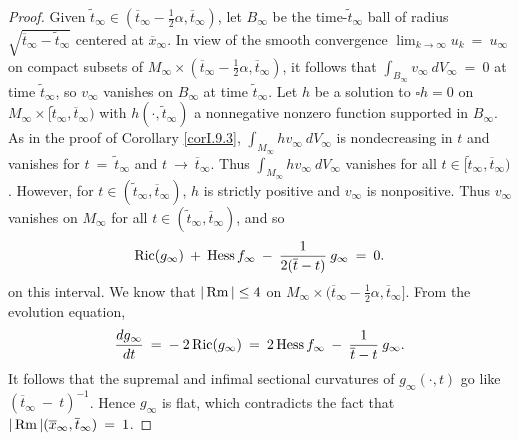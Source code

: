 \begin{proof}
Given $\widetilde{t}_\infty \in (\overline{t}_\infty -
\frac12 \alpha, \overline{t}_\infty)$,
let $B_\infty$ be the time-$\widetilde{t}_\infty$ ball of radius
$\sqrt{\overline{t}_\infty - \widetilde{t}_\infty}$
centered at $\overline{x}_\infty$.
In view of the smooth convergence
$\lim_{k \rightarrow \infty} u_k \: = \: u_\infty$ on
compact subsets of
$M_\infty \times (\overline{t}_\infty - \frac12 \alpha,
\overline{t}_\infty)$,
it follows that
$\int_{B_\infty} v_\infty \: dV_\infty \: = \: 0$ at time $\widetilde{t}_\infty$, so
$v_\infty$ vanishes on $B_\infty$ at time $\widetilde{t}_\infty$. Let $h$ be a solution
to $\square h = 0$ on $M_\infty \times [\widetilde{t}_\infty, \overline{t}_\infty)$ with
$h(\cdot, \widetilde{t}_\infty)$ a nonnegative nonzero function supported in
$B_\infty$. As in the proof of Corollary \ref{corI.9.3},
$\int_{M_\infty} h v_\infty \: dV_\infty$ is nondecreasing in $t$ and vanishes for
$t \: = \: \widetilde{t}_\infty$ and  $t \: \rightarrow \: \overline{t}_\infty$.
Thus $\int_{M_\infty} h v_\infty \: dV_\infty$ vanishes for all
$t \in [\widetilde{t}_\infty, \overline{t}_\infty)$. However, for $t \in
(\widetilde{t}_\infty, \overline{t}_\infty)$, $h$ is strictly positive and
$v_\infty$ is nonpositive.  Thus $v_\infty$ vanishes on $M_\infty$ for all
$t \in (\widetilde{t}_\infty, \overline{t}_\infty)$, and so
\begin{equation}
\operatorname{Ric}(g_\infty) \: + \: \operatorname{Hess} f_\infty \: - \:
\frac{1}{2(\overline{t} - t)} \: g_{\infty} \: = \: 0.
\end{equation}
on this interval.
We know that $|\operatorname{Rm}| \le 4$ on
$M_\infty \times (\overline{t}_\infty -
\frac12 \alpha, \overline{t}_\infty]$.
From the evolution equation,
\begin{equation}
\frac{dg_{\infty}}{dt} \: = \: - \: 2 \operatorname{Ric}(g_\infty) \: = \:
2 \operatorname{Hess} f_\infty \: - \:
\frac{1}{\overline{t} - t} \: g_{\infty}.
\end{equation}
It follows that the supremal and infimal
sectional curvatures of $g_\infty(\cdot,t)$ go like
$(\overline{t}_\infty \: - \: t)^{-1}$.
Hence $g_\infty$ is flat,
which contradicts the fact that
$|\operatorname{Rm}|(\overline{x}_\infty, \overline{t}_\infty) \: = \: 1$.



\end{proof}
